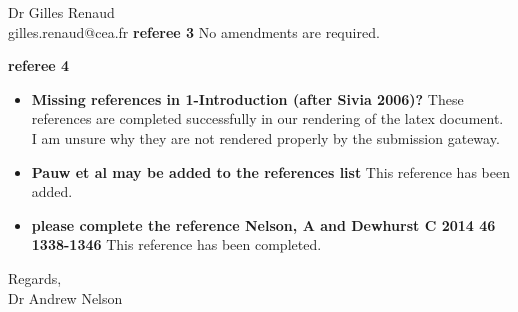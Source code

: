\documentclass[fontsize=12pt, paper=a4]{scrlttr2}
\begin{document}
\begin{letter}{Dr Gilles Renaud \\ gilles.renaud@cea.fr}
\textbf{referee 3}
No amendments are required.


\textbf{referee 4}
\begin{itemize}
\item \textbf{Missing references in 1-Introduction (after Sivia 2006)?} These references are completed successfully in our rendering of the latex document. I am unsure why they are not rendered properly by the submission gateway.
\item \textbf{Pauw et al may be added to the references list} This reference has been added.
\item \textbf{please complete the reference Nelson, A and Dewhurst C 2014 46 1338-1346} This reference has been completed.
\end{itemize}


\closing{Regards, \\ Dr Andrew Nelson} %

\end{letter}
\end{document}
